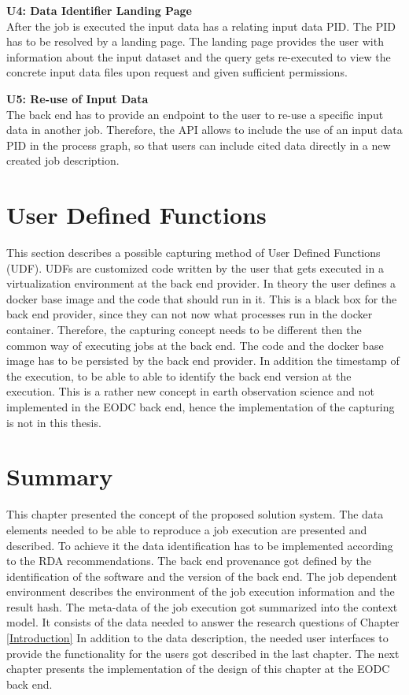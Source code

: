\documentclass[draft,final]{vutinfth} %
\begin{document}
\textbf{U4: Data Identifier Landing Page} \\
After the job is executed the input data has a relating input data PID. The PID has to be resolved by a landing page. The landing page provides the user with information about the input dataset and the query gets re-executed to view the concrete input data files upon request and given sufficient permissions.
    
\textbf{U5: Re-use of Input Data} \\
 The back end has to provide an endpoint to the user to re-use a specific input data in another job. Therefore, the API allows to include the use of an input data PID in the process graph, so that users can include cited data directly in a new created job description.  

\section{User Defined Functions}\label{Design:User Defined Functions}
This section describes a possible capturing method of User Defined Functions (UDF). UDFs are customized code written by the user that gets executed in a virtualization environment at the back end provider. In theory the user defines a docker base image and the code that should run in it. This is a black box for the back end provider, since they can not now what processes run in the docker container. Therefore, the capturing concept needs to be different then the common way of executing jobs at the back end. The code and the docker base image has to be persisted by the back end provider. In addition the timestamp of the execution, to be able to able to identify the back end version at the execution. This is a rather new concept in earth observation science and not implemented in the EODC back end, hence the implementation of the capturing is not in this thesis.


\section{Summary}
This chapter presented the concept of the proposed solution system. The data elements needed to be able to reproduce a job execution are presented and described. To achieve it the data identification has to be implemented according to the RDA recommendations. The back end provenance got defined by the identification of the software and the version of the back end. The job dependent environment describes the environment of the job execution information and the result hash. The meta-data of the job execution got summarized into the context model. It consists of the data needed to answer the research questions of Chapter \ref{Introduction} In addition to the data description, the needed user interfaces to provide the functionality for the users got described in the last chapter. The next chapter presents the implementation of the design of this chapter at the EODC back end.     
\end{document}
